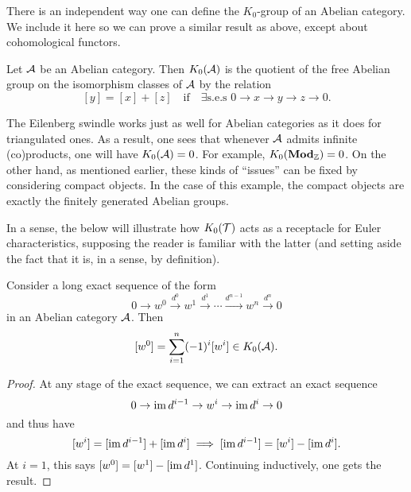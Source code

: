There is an independent way one can define the \(K_0\)-group of an Abelian category. We include it here so we can prove a similar result as above, except about cohomological functors.
\begin{definition}
	Let \(\mathcal{A}\) be an Abelian category. Then \(K_0(\mathcal{A})\) is the quotient of the free Abelian group on the isomorphism classes of \(\mathcal{A}\) by the relation
	\[ [y] = [x] + [z] \quad\text{if}\quad \exists\text{s.e.s } 0 \to x \to y \to z \to 0. \]
\end{definition}
\begin{remark}
	The Eilenberg swindle works just as well for Abelian categories as it does for triangulated ones. As a result, one sees that whenever \(\mathcal{A}\) admits
	infinite (co)products, one will have \(K_0(\mathcal{A})=0\). For example, \(K_0(\mathbf{Mod}_{\mathbb{Z}}) = 0\). On the other hand, as mentioned earlier, these kinds of ``issues''
	can be fixed by considering compact objects. In the case of this example, the compact objects are exactly the finitely generated Abelian groups.
\end{remark}

In a sense, the below will illustrate how \(K_0(\mathcal{T})\) acts as a receptacle for Euler characteristics, supposing the reader is familiar with the latter (and setting aside the fact
that it is, in a sense, by definition).

\begin{lemma}
	Consider a long exact sequence of the form
	\[ 0 \to w^0 \overset{d^0}\to w^1 \overset{d^1}\to \cdots \overset{d^{n-1}}\to w^n \overset{d^n}\to 0 \]
	in an Abelian category \(\mathcal{A}\). Then
	\[ [w^0] = \sum_{i=1}^n(-1)^i[w^i] \in K_0(\mathcal{A}). \]
\end{lemma}
\begin{proof}
At any stage of the exact sequence, we can extract an exact sequence
\[ 0 \to \operatorname{im}{d^{i-1}} \to w^i \to \operatorname{im}{d^i} \to 0 \]
and thus have
\[ [w^i] = [\operatorname{im}{d^{i-1}}] + [\operatorname{im}{d^i}] \implies [\operatorname{im}{d^{i-1}}] = [w^i] - [\operatorname{im}{d^i}]. \]
At \(i=1\), this says \([w^0] = [w^1] - [\operatorname{im}{d^1}]\). Continuing inductively, one gets the result.
\end{proof}


